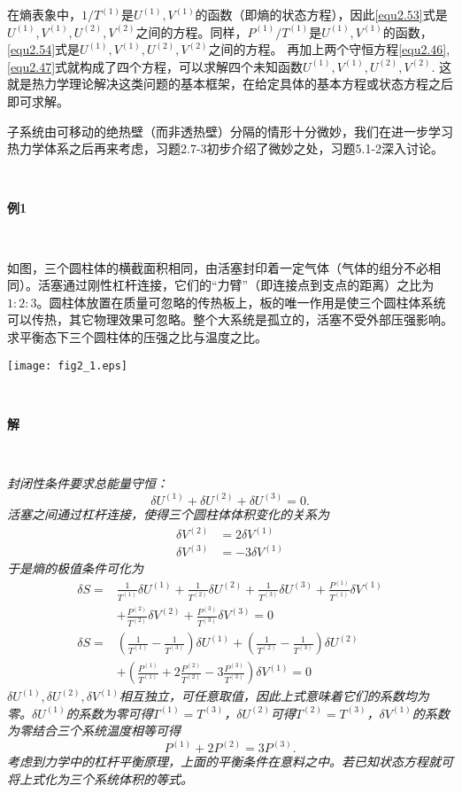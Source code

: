 在熵表象中，$1 / T^{(1)}$是$U^{(1)}, V^{(1)}$的函数（即熵的状态方程），因此\eqref{equ2.53}式是$U^{(1)}, V^{(1)}, U^{(2)}, V^{(2)}$之间的方程。同样，$P^{(1)} / T^{(1)}$是$U^{(1)}, V^{(1)}$的函数，\eqref{equ2.54}式是$U^{(1)}, V^{(1)}, U^{(2)}, V^{(2)}$之间的方程。 再加上两个守恒方程\eqref{equ2.46}, \eqref{equ2.47}式就构成了四个方程，可以求解四个未知函数$U^{(1)}, V^{(1)}, U^{(2)}, V^{(2)}$. 这就是热力学理论解决这类问题的基本框架，在给定具体的基本方程或状态方程之后即可求解。

子系统由可移动的绝热壁（而非透热壁）分隔的情形十分微妙，我们在进一步学习热力学体系之后再来考虑，习题2.7-3初步介绍了微妙之处，习题5.1-2深入讨论。

\ 

{\bf 例1}

\ 

如图，三个圆柱体的横截面积相同，由活塞封印着一定气体（气体的组分不必相同）。活塞通过刚性杠杆连接，它们的“力臂”（即连接点到支点的距离）之比为$1 : 2 : 3$。圆柱体放置在质量可忽略的传热板上，板的唯一作用是使三个圆柱体系统可以传热，其它物理效果可忽略。整个大系统是孤立的，活塞不受外部压强影响。求平衡态下三个圆柱体的压强之比与温度之比。

{
	\centering
	\texttt{[image: fig2\_1.eps]} 
}

\ 

{\bf 解}

\ 

{\it 
	封闭性条件要求总能量守恒：
	\[
		\delta U^{(1)} + \delta U^{(2)} + \delta U^{(3)} = 0.
	\]
	活塞之间通过杠杆连接，使得三个圆柱体体积变化的关系为
	\begin{align*}
		\delta V^{(2)} &= 2 \delta V^{(1)} \\
		\delta V^{(3)} &= -3 \delta V^{(1)}
	\end{align*}
	于是熵的极值条件可化为
	\begin{align*}
		\delta S =& \frac{1}{T^{(1)}} \delta U^{(1)} + \frac{1}{T^{(2)}} \delta U^{(2)} + \frac{1}{T^{(3)}} \delta U^{(3)} + \frac{P^{(1)}}{T^{(1)}} \delta V^{(1)} \\
		&+ \frac{P^{(2)}}{T^{(2)}} \delta V^{(2)} + \frac{P^{(3)}}{T^{(3)}} \delta V^{(3)} = 0 \\
		\delta S =& \left( \frac{1}{T^{(1)}} - \frac{1}{T^{(3)}} \right) \delta U^{(1)} + \left( \frac{1}{T^{(2)}} - \frac{1}{T^{(3)}} \right) \delta U^{(2)} \\
		&+ \left( \frac{P^{(1)}}{T^{(1)}} + 2\frac{P^{(2)}}{T^{(2)}} - 3\frac{P^{(3)}}{T^{(3)}} \right) \delta V^{(1)} = 0
	\end{align*}
	$\delta U^{(1)}, \delta U^{(2)}, \delta V^{(1)}$相互独立，可任意取值，因此上式意味着它们的系数均为零。$\delta U^{(1)}$的系数为零可得$T^{(1)} = T^{(3)}$，$\delta U^{(2)}$可得$T^{(2)} = T^{(3)}$，$\delta V^{(1)}$的系数为零结合三个系统温度相等可得
	\[ P^{(1)} + 2P^{(2)} = 3P^{(3)}. \]
	考虑到力学中的杠杆平衡原理，上面的平衡条件在意料之中。若已知状态方程就可将上式化为三个系统体积的等式。
}

